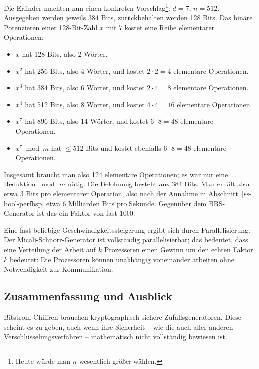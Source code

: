 \begin{refsegment}
Die Erfinder machten nun einen konkreten Vorschlag\footnote{%
  Heute würde man $n$ wesentlich größer wählen.
}:
$d= 7$, $n = 512$. Ausgegeben werden jeweils 384 Bits,
zurückbehalten werden 128 Bits. Das binäre Potenzieren
einer 128-Bit-Zahl $x$ mit 7 kostet eine Reihe elementarer
Operationen:
\begin{itemize}
    \item $x$ hat 128 Bits, also 2 Wörter.
    \item $x^2$ hat 256 Bits, also 4 Wörter, und
          kostet $2 \cdot 2 = 4$ elementare Operationen.
    \item $x^3$ hat 384 Bits, also 6 Wörter, und kostet
          $2 \cdot 4 = 8$ elementare Operationen.
    \item $x^4$ hat 512 Bits, also 8 Wörter, und kostet
          $4 \cdot 4 = 16$ elementare Operationen.
    \item $x^7$ hat 896 Bits, also 14 Wörter, und kostet
          $6 \cdot 8 = 48$ elementare Operationen.
    \item $x^7 \bmod m$ hat $\leq 512$ Bits und kostet
          ebenfalls $6 \cdot 8 = 48$ elementare Operationen.
\end{itemize}
Insgesamt braucht man also 124 elementare Operationen; es war
nur eine Reduktion $\bmod\,m$ nötig. Die Belohnung besteht
aus 384 Bits. Man erhält also etwa 3 Bits pro elementarer
Operation, also nach der Annahme in Abschnitt~\ref{ss-bool-perfbsp}
etwa 6 Milliarden Bits pro Sekunde. Gegenüber dem BBS-Generator
ist das ein Faktor von fast 1000.

Eine fast beliebige Geschwindigkeitssteigerung ergibt sich
durch Parallelisierung: Der Micali-Schnorr-Generator
ist vollständig parallelisierbar; das bedeutet, dass eine Verteilung
der Arbeit auf $k$ Prozessoren einen Gewinn um den echten Faktor
$k$ bedeutet: Die Prozessoren können unabhängig voneinander
arbeiten ohne Notwendigkeit zur Kommunikation.

\subsection{Zusammenfassung und Ausblick}\label{ss-bool-prg-res}

Bitstrom-Chiffren brauchen kryptographisch
sichere Zufallsgeneratoren. Diese scheint
es zu geben, auch wenn ihre Sicherheit -- wie die auch aller
anderen Verschlüsselungsverfahren -- mathematisch nicht vollständig
bewiesen ist.


\end{refsegment}
